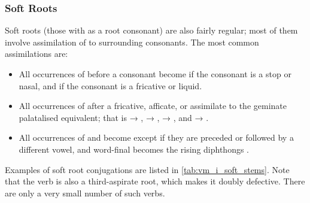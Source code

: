 \documentclass[grammar]{subfiles}
\begin{document}
\subsubsection{Soft Roots}
\label{sssec:vm_i_soft}

Soft roots (those with  as a root consonant) are also fairly regular; 
most of them involve assimilation of  to surrounding consonants. The most 
common assimilations are:

\begin{itemize}
  \item All occurrences of  before a consonant become  if the consonant is a
    stop or nasal, and  if the consonant is a fricative or liquid.  
  \item All occurrences of  after a fricative, afficate, or  assimilate to the
    geminate palatalised equivalent; that is  → ,  →
    ,  → , and  → .
  \item All occurrences of  and  become  except if they are
    preceded or followed by a different vowel, and word-final  becomes the
    rising diphthongs . 
\end{itemize}

Examples of soft root conjugations are listed in \cref{tab:vm_i_soft_stems}.
Note that the verb  is also a third-aspirate root, which makes it
doubly defective.  There are only a very small number of such verbs.  
\end{document}

